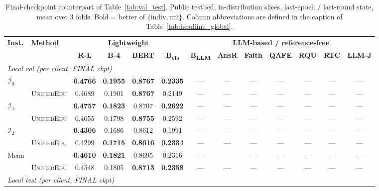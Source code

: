 \documentclass[11pt]{article}
\theoremstyle{plain}
\theoremstyle{definition}
\theoremstyle{remark}
\newcommand{\UniEdu}{\textsc{UnifiedEdu}}
\newcommand{\indiv}{\text{indiv}}
\newcommand{\uni}{\text{uni}}
\begin{document}
\begin{table}[t]
\centering
\footnotesize
\setlength{\tabcolsep}{2pt}
\caption{Final-checkpoint counterpart of
Table~\ref{tab:val_test}. Public testbed, in-distribution
slices, last-epoch / last-round state, mean over 3
folds. Bold = better of $\{\indiv, \uni\}$. Column
abbreviations are defined in the caption of
Table~\ref{tab:headline_global}.}
\label{tab:appendix_val_test_final}
\begin{tabular}{ll cccc ccccccc}
\toprule
\multirow{2}{*}{\textbf{Inst.}} &
\multirow{2}{*}{\textbf{Method}} &
\multicolumn{4}{c}{\textbf{Lightweight}} &
\multicolumn{7}{c}{\textbf{LLM-based / reference-free}} \\
\cmidrule(lr){3-6} \cmidrule(lr){7-13}
& &
\textbf{R-L} & \textbf{B-4} & \textbf{BERT} & \textbf{B\textsubscript{cls}} &
\textbf{B\textsubscript{LLM}} & \textbf{AnsR} & \textbf{Faith} & \textbf{QAFE} &
\textbf{RQU} & \textbf{RTC} & \textbf{LLM-J} \\
\midrule
\multicolumn{13}{l}{\textit{Local val (per client, FINAL ckpt)}} \\
\midrule
\multirow{2}{*}{$\mathcal{I}_0$}
  & \indiv     & \textbf{0.4766} & \textbf{0.1955} & \textbf{0.8767} & \textbf{0.2335} & --- & --- & --- & --- & --- & --- & --- \\
  & \UniEdu{}  & 0.4689 & 0.1901 & \textbf{0.8767} & 0.2149 & --- & --- & --- & --- & --- & --- & --- \\
\multirow{2}{*}{$\mathcal{I}_1$}
  & \indiv     & \textbf{0.4757} & \textbf{0.1823} & 0.8707 & \textbf{0.2622} & --- & --- & --- & --- & --- & --- & --- \\
  & \UniEdu{}  & 0.4655 & 0.1798 & \textbf{0.8755} & 0.2592 & --- & --- & --- & --- & --- & --- & --- \\
\multirow{2}{*}{$\mathcal{I}_2$}
  & \indiv     & \textbf{0.4306} & 0.1686 & 0.8612 & 0.1991 & --- & --- & --- & --- & --- & --- & --- \\
  & \UniEdu{}  & 0.4299 & \textbf{0.1715} & \textbf{0.8616} & \textbf{0.2334} & --- & --- & --- & --- & --- & --- & --- \\
\multirow{2}{*}{Mean}
  & \indiv     & \textbf{0.4610} & \textbf{0.1821} & 0.8695 & 0.2316 & --- & --- & --- & --- & --- & --- & --- \\
  & \UniEdu{}  & 0.4548 & 0.1805 & \textbf{0.8713} & \textbf{0.2358} & --- & --- & --- & --- & --- & --- & --- \\
\midrule
\multicolumn{13}{l}{\textit{Local test (per client, FINAL ckpt)}} \\

\end{tabular}
\end{table}
\end{document}
